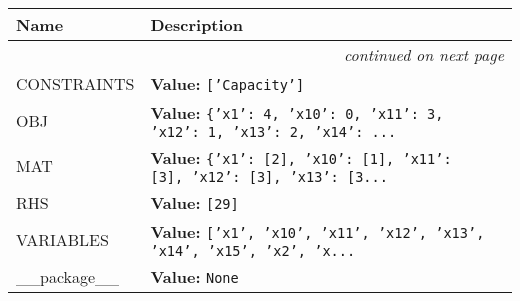     \vspace{-1cm}
\hspace{\varindent}\begin{longtable}{|p{\varnamewidth}|p{\vardescrwidth}|l}
\cline{1-2}
\cline{1-2} \centering \textbf{Name} & \centering \textbf{Description}& \\
\cline{1-2}
\endhead\cline{1-2}\multicolumn{3}{r}{\small\textit{continued on next page}}\\\endfoot\cline{1-2}
\endlastfoot\raggedright C\-O\-N\-S\-T\-R\-A\-I\-N\-T\-S\- & \raggedright \textbf{Value:} 
{\tt \texttt{[}\texttt{'}\texttt{Capacity}\texttt{'}\texttt{]}}&\\
\cline{1-2}
\raggedright O\-B\-J\- & \raggedright \textbf{Value:} 
{\tt \texttt{\{}\texttt{'}\texttt{x1}\texttt{'}\texttt{: }4\texttt{, }\texttt{'}\texttt{x10}\texttt{'}\texttt{: }0\texttt{, }\texttt{'}\texttt{x11}\texttt{'}\texttt{: }3\texttt{, }\texttt{'}\texttt{x12}\texttt{'}\texttt{: }1\texttt{, }\texttt{'}\texttt{x13}\texttt{'}\texttt{: }2\texttt{, }\texttt{'}\texttt{x14}\texttt{'}\texttt{: }\texttt{...}}&\\
\cline{1-2}
\raggedright M\-A\-T\- & \raggedright \textbf{Value:} 
{\tt \texttt{\{}\texttt{'}\texttt{x1}\texttt{'}\texttt{: }\texttt{[}2\texttt{]}\texttt{, }\texttt{'}\texttt{x10}\texttt{'}\texttt{: }\texttt{[}1\texttt{]}\texttt{, }\texttt{'}\texttt{x11}\texttt{'}\texttt{: }\texttt{[}3\texttt{]}\texttt{, }\texttt{'}\texttt{x12}\texttt{'}\texttt{: }\texttt{[}3\texttt{]}\texttt{, }\texttt{'}\texttt{x13}\texttt{'}\texttt{: }\texttt{[}3\texttt{...}}&\\
\cline{1-2}
\raggedright R\-H\-S\- & \raggedright \textbf{Value:} 
{\tt \texttt{[}29\texttt{]}}&\\
\cline{1-2}
\raggedright V\-A\-R\-I\-A\-B\-L\-E\-S\- & \raggedright \textbf{Value:} 
{\tt \texttt{[}\texttt{'}\texttt{x1}\texttt{'}\texttt{, }\texttt{'}\texttt{x10}\texttt{'}\texttt{, }\texttt{'}\texttt{x11}\texttt{'}\texttt{, }\texttt{'}\texttt{x12}\texttt{'}\texttt{, }\texttt{'}\texttt{x13}\texttt{'}\texttt{, }\texttt{'}\texttt{x14}\texttt{'}\texttt{, }\texttt{'}\texttt{x15}\texttt{'}\texttt{, }\texttt{'}\texttt{x2}\texttt{'}\texttt{, }\texttt{'}\texttt{x}\texttt{...}}&\\
\cline{1-2}
\raggedright \_\-\_\-p\-a\-c\-k\-a\-g\-e\-\_\-\_\- & \raggedright \textbf{Value:} 
{\tt None}&\\
\cline{1-2}
\end{longtable}


